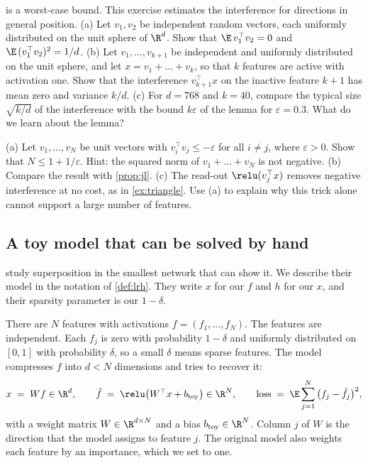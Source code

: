 \begin{exercise}\label{ex:typical}
 is a worst-case bound. This exercise estimates the interference for directions in general
position. (a) Let $v_1,v_2$ be independent random vectors, each uniformly distributed on the unit sphere of
$\R^d$. Show that $\E\,v_1^\top v_2=0$ and $\E\,(v_1^\top v_2)^2=1/d$. (b) Let $v_1,\dots,v_{k+1}$ be independent
and uniformly distributed on the unit sphere, and let $x=v_1+\dots+v_k$, so that $k$ features are active with
activation one. Show that the interference $v_{k+1}^\top x$ on the inactive feature $k+1$ has mean zero and
variance $k/d$. (c) For $d=768$ and $k=40$, compare the typical size $\sqrt{k/d}$ of the interference with the
bound $k\varepsilon$ of the lemma for $\varepsilon=0.3$. What do we learn about the lemma?
\end{exercise}

\begin{exercise}\label{ex:negative}
(a) Let $v_1,\dots,v_N$ be unit vectors with $v_i^\top v_j\le-\varepsilon$ for all $i\ne j$, where
$\varepsilon>0$. Show that $N\le1+1/\varepsilon$. Hint: the squared norm of $v_1+\dots+v_N$ is not negative.
(b) Compare the result with \cref{prop:jl}. (c) The read-out $\relu(v_j^\top x)$ removes negative interference at
no cost, as in \cref{ex:triangle}. Use (a) to explain why this trick alone cannot support a large number of
features.
\end{exercise}

\subsection{A toy model that can be solved by hand}
\label{sec:toy}

\citet{elhage2022toy} study superposition in the smallest network that can show it. We describe their model in
the notation of \cref{def:lrh}. They write $x$ for our $f$ and $h$ for our $x$, and their sparsity parameter is our $1-\delta$.

There are $N$ features with activations $f=(f_1,\dots,f_N)$. The features are independent. Each $f_j$ is zero
with probability $1-\delta$ and uniformly distributed on $[0,1]$ with probability $\delta$, so a small $\delta$
means sparse features. The model compresses $f$ into $d<N$ dimensions and tries to recover it:
\begin{equation}\label{eq:toy}
x \;=\; Wf\in\R^d,\qquad \hat f \;=\; \relu\big(W^\top x+b_{\mathrm{toy}}\big)\in\R^N,\qquad
\text{loss} \;=\; \E\sum_{j=1}^{N}\big(f_j-\hat f_j\big)^2 ,
\end{equation}
with a weight matrix $W\in\R^{d\times N}$ and a bias $b_{\mathrm{toy}}\in\R^N$. Column $j$ of $W$ is the direction
that the model assigns to feature $j$. The original model also weights each feature by an importance, which we
set to one.

